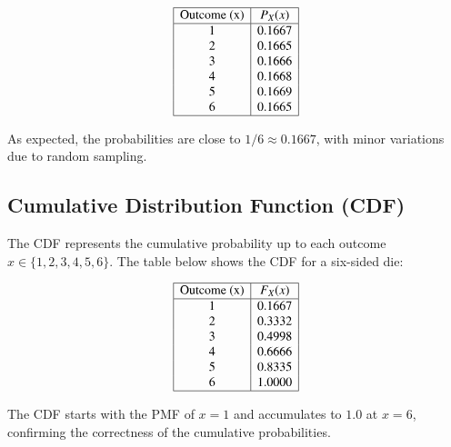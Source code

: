 \documentclass[journal]{IEEEtran}
\begin{document}
\[
\begin{array}{|c|c|}
\hline
\text{Outcome (x)} & P_X(x) \\
\hline
1 & 0.1667 \\
2 & 0.1665 \\
3 & 0.1666 \\
4 & 0.1668 \\
5 & 0.1669 \\
6 & 0.1665 \\
\hline
\end{array}
\]

As expected, the probabilities are close to \(1/6 \approx 0.1667\), with minor variations due to random sampling.

\subsection*{Cumulative Distribution Function (CDF)}
The CDF represents the cumulative probability up to each outcome \(x \in \{1, 2, 3, 4, 5, 6\}\). The table below shows the CDF for a six-sided die:

\[
\begin{array}{|c|c|}
\hline
\text{Outcome (x)} & F_X(x) \\
\hline
1 & 0.1667 \\
2 & 0.3332 \\
3 & 0.4998 \\
4 & 0.6666 \\
5 & 0.8335 \\
6 & 1.0000 \\
\hline
\end{array}
\]

The CDF starts with the PMF of \(x = 1\) and accumulates to \(1.0\) at \(x = 6\), confirming the correctness of the cumulative probabilities. \\
\end{document}
